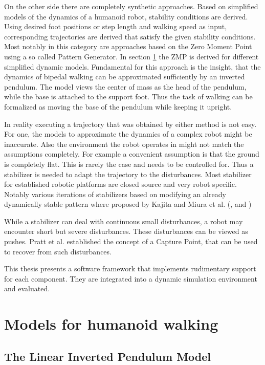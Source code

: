 \documentclass[english,ngerman]{KITreprt}
\begin{document}
On the other side there are completely synthetic approaches. Based on
simplified models of the dynamics of a humanoid robot, stability
conditions are derived. Using desired foot positions or step length and
walking speed as input, corresponding trajectories are derived that
satisfy the given stability conditions. Most notably in this category
are approaches based on the Zero Moment Point using a so called Pattern
Generator. In section \ref{section:walking-models} the ZMP is derived
for different simplified dynamic models. Fundamental for this approach
is the insight, that the dynamics of bipedal walking can be approximated
sufficiently by an inverted pendulum. The model views the center of mass
as the head of the pendulum, while the base is attached to the support
foot. Thus the task of walking can be formalized as moving the base of
the pendulum while keeping it upright.

In reality executing a trajectory that was obtained by either method is
not easy. For one, the models to approximate the dynamics of a complex
robot might be inaccurate. Also the environment the robot operates in
might not match the assumptions completely. For example a convenient
assumption is that the ground is completely flat. This is rarely the
case and needs to be controlled for. Thus a stabilizer is needed to
adapt the trajectory to the disturbances. Most stabilizer for
established robotic platforms are closed source and very robot specific.
Notably various iterations of stabilizers based on modifying an already
dynamically stable pattern where proposed by Kajita and Miura et al.
(\cite{kajita2010biped}, \cite{miura2011human} and
\cite{kajita2012evaluation})

While a stabilizer can deal with continuous small disturbances, a robot
may encounter short but severe disturbances. These disturbances can be
viewed as pushes. Pratt et al. established the concept of a Capture
Point, that can be used to recover from such disturbances.

This thesis presents a software framework that implements rudimentary
support for each component. They are integrated into a dynamic
simulation environment and evaluated.

\chapter{Models for humanoid walking}\label{section:walking-models}

\section{The Linear Inverted Pendulum
Model}\label{the-linear-inverted-pendulum-model}
\end{document}

